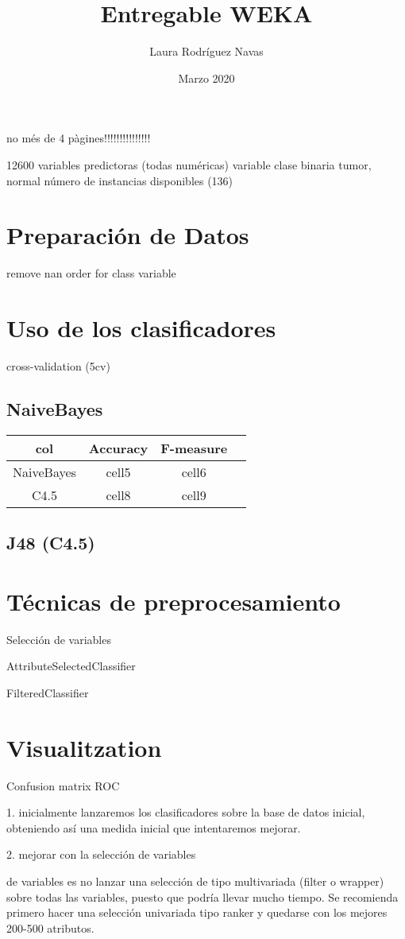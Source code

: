 \documentclass{article}
\title{Entregable WEKA}
\author{Laura Rodríguez Navas}
\date{Marzo 2020}
\begin{document}
\maketitle

no més de 4 pàgines!!!!!!!!!!!!!!!

12600 variables predictoras (todas numéricas)
variable clase binaria {tumor, normal}
número de instancias disponibles (136)

\section*{Preparación de Datos}

remove nan
order for class variable


\section*{Uso de los clasificadores}

cross-validation (5cv)

\subsection*{NaiveBayes}

\begin{center}
	\begin{tabular}{ |c|c|c|c| } 
		\hline
		col & Accuracy & F-measure \\
		\hline
		NaiveBayes& cell5 & cell6 \\ 
		C4.5 & cell8 & cell9 \\ 
		\hline
	\end{tabular}
\end{center}

\subsection*{J48 (C4.5)}

\section*{Técnicas de preprocesamiento}

Selección de variables

AttributeSelectedClassifier

FilteredClassifier

\section*{Visualitzation}

Confusion matrix
ROC




1. inicialmente lanzaremos los clasificadores sobre la base de datos inicial, obteniendo así una medida inicial que intentaremos mejorar.

2. mejorar con la selección de variables

de variables es no lanzar una selección de tipo multivariada (filter o wrapper) sobre todas las variables, puesto que podría llevar mucho tiempo. Se recomienda primero hacer una selección univariada tipo ranker y quedarse con los mejores 200-500 atributos.
\end{document}
